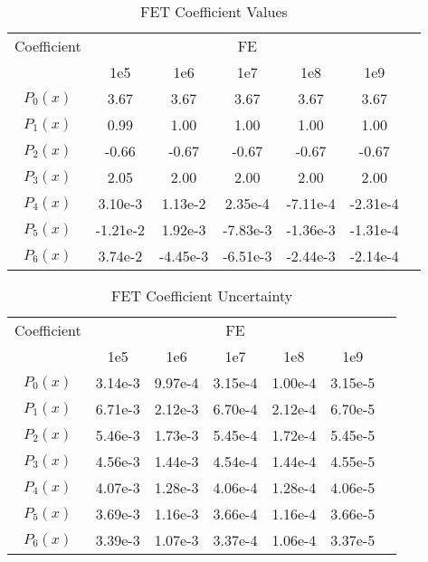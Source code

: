 \documentclass[10tma4paper]{article}
\begin{document}
\begin{table}[!htbp]
	\caption{FET Coefficient Values}
	\centering
	\begin{tabular}{c c c c c c c }
		\hline
		Coefficient & &  & FE  &  & & \\[0.5ex]
		 & 1e5 & 1e6 & 1e7 & 1e8 & 1e9 &\\
		 \hline		
		\hline
		$P_{0}(x)$ & 3.67     & 3.67     & 3.67     & 3.67     & 3.67     & \\
		$P_{1}(x)$ & 0.99     & 1.00     & 1.00     & 1.00     & 1.00     & \\
		$P_{2}(x)$ & -0.66    & -0.67    & -0.67    & -0.67    & -0.67    & \\
		$P_{3}(x)$ & 2.05     & 2.00     & 2.00     & 2.00     & 2.00     & \\
		$P_{4}(x)$ & 3.10e-3  & 1.13e-2  & 2.35e-4  & -7.11e-4 & -2.31e-4 & \\
		$P_{5}(x)$ & -1.21e-2 & 1.92e-3  & -7.83e-3 & -1.36e-3 & -1.31e-4 & \\
		$P_{6}(x)$ & 3.74e-2  & -4.45e-3 & -6.51e-3 & -2.44e-3 & -2.14e-4 & \\ [1ex]
		\hline
	\end{tabular}
	\label{table:coef res}
\end{table}
\begin{table}[!htbp]
	\caption{FET Coefficient Uncertainty}
	\centering
	\begin{tabular}{c c c c c c c }
		\hline
		Coefficient & & & FE & & & \\[0.5ex]
		& 1e5 & 1e6 & 1e7 & 1e8 & 1e9 &\\
		\hline		
		\hline
		$P_{0}(x)$ & 3.14e-3 & 9.97e-4 & 3.15e-4 & 1.00e-4 & 3.15e-5 & \\
		$P_{1}(x)$ & 6.71e-3 & 2.12e-3 & 6.70e-4 & 2.12e-4 & 6.70e-5 & \\
		$P_{2}(x)$ & 5.46e-3 & 1.73e-3 & 5.45e-4 & 1.72e-4 & 5.45e-5 & \\
		$P_{3}(x)$ & 4.56e-3 & 1.44e-3 & 4.54e-4 & 1.44e-4 & 4.55e-5 & \\
		$P_{4}(x)$ & 4.07e-3 & 1.28e-3 & 4.06e-4 & 1.28e-4 & 4.06e-5 & \\
		$P_{5}(x)$ & 3.69e-3 & 1.16e-3 & 3.66e-4 & 1.16e-4 & 3.66e-5 & \\
		$P_{6}(x)$ & 3.39e-3 & 1.07e-3 & 3.37e-4 & 1.06e-4 & 3.37e-5 & \\ [1ex]
		\hline
	\end{tabular}
	\label{table:coef unc res}
\end{table}
\\
\end{document}

